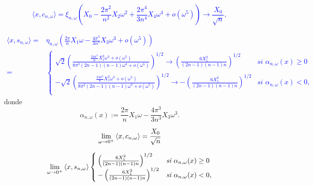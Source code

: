 \textcolor{blue}{
\[
\langle x,
c_{n, \omega}
\rangle = 
\xi_{n, \omega} 
\left(
X_{0} - \frac{2 \pi^{2}}{n^{2}}X_{2} \omega^{2} 
+ \frac{2 \pi^{4}}{3n^{4}} X_{4} \omega^{4} + o(\omega^{5})
\right) \rightarrow \frac{X_{0}}{\sqrt{n}} ,
\]
}

\textcolor{blue}{
\begin{align*}
\langle x,
s_{n, \omega}
\rangle = &
\eta_{n, \omega} 
\left(
\frac{2 \pi}{n} X_{1} \omega - \frac{4 \pi^{3}}{3n^{3}}X_{3} \omega^{3} 
 + o(\omega^{5})
\right)\\
= &
\begin{cases}
\sqrt{2} \left(
\frac{
\frac{24 \pi^{3}}{n}X_{1}^{2}\omega^{3} + o(\omega^{5}) }{
8 \pi^{3} (2n-1)(n-1)\omega^{3} + o(\omega^{5})
}
\right)^{1/2}
\rightarrow \left(
\frac{6 X_{1}^{2}}{(2n-1)(n-1)n}
\right)^{1/2} & \textit{si } \alpha_{n, \omega}(x) \geq 0 \\
-\sqrt{2} \left(
\frac{
\frac{24 \pi^{3}}{n}X_{1}^{2}\omega^{3} + o(\omega^{5}) }{
8 \pi^{3} (2n-1)(n-1)\omega^{3} + o(\omega^{5})
}
\right)^{1/2}
\rightarrow -\left(
\frac{6 X_{1}^{2}}{(2n-1)(n-1)n}
\right)^{1/2} & \textit{si } \alpha_{n, \omega}(x) < 0,\\
\end{cases}
\end{align*}
}
donde
\[
\alpha_{n, \omega}(x) := 
\frac{2 \pi}{n} X_{1} \omega - \frac{4 \pi^{3}}{3n^{3}}X_{3} \omega^{3}.
\] 






\begin{equation}
\label{ec: limite x, cnw}
\lim\limits_{\omega \rightarrow 0^{+}}{\langle
x, c_{n, \omega}
\rangle }
= \frac{X_{0}}{\sqrt{n}}
\end{equation}

\begin{equation}
\label{ec: limite x, snw}
\lim\limits_{\omega \rightarrow 0^{+}}{\langle
x, s_{n, \omega}
\rangle }
\begin{cases}
\left(
\frac{6 X_{1}^{2}}{(2n-1)(n-1)n}
\right)^{1/2} & \textit{si } \alpha_{n, \omega}(x) \geq 0 \\
-\left(
\frac{6 X_{1}^{2}}{(2n-1)(n-1)n}
\right)^{1/2} & \textit{si } \alpha_{n, \omega}(x) < 0,\\
\end{cases}
\end{equation}

